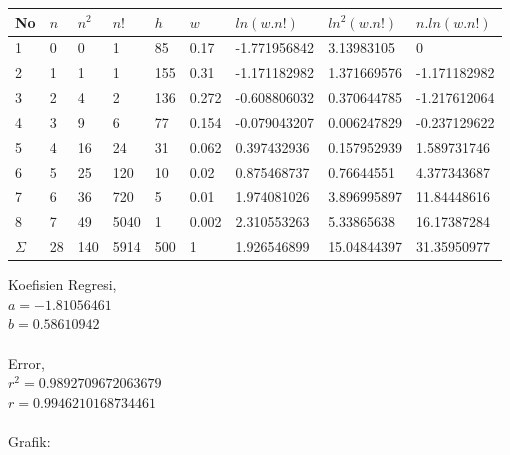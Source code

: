 \documentclass{article}
\begin{document}
			\begin{longtable}{@{}lllllllll@{}}
					\toprule
					No  & $n$  & $n^{2}$ & $n!$   & $h$   & $w$     & $ln(w.n!)$     & $ln^{2}(w.n!)$ & $n.ln(w.n!)$   \\ \midrule
				\endfirsthead
				\endhead
				\bottomrule
				\endfoot
				\endlastfoot
				1   & 0  & 0                    & 1    & 85  & 0.17  & -1.771956842 & 3.13983105                  & 0            \\
				2   & 1  & 1                    & 1    & 155 & 0.31  & -1.171182982 & 1.371669576                 & -1.171182982 \\
				3   & 2  & 4                    & 2    & 136 & 0.272 & -0.608806032 & 0.370644785                 & -1.217612064 \\
				4   & 3  & 9                    & 6    & 77  & 0.154 & -0.079043207 & 0.006247829                 & -0.237129622 \\
				5   & 4  & 16                   & 24   & 31  & 0.062 & 0.397432936  & 0.157952939                 & 1.589731746  \\
				6   & 5  & 25                   & 120  & 10  & 0.02  & 0.875468737  & 0.76644551                  & 4.377343687  \\
				7   & 6  & 36                   & 720  & 5   & 0.01  & 1.974081026  & 3.896995897                 & 11.84448616  \\
				8   & 7  & 49                   & 5040 & 1   & 0.002 & 2.310553263  & 5.33865638                  & 16.17387284  \\* \midrule
				$\Sigma$ & 28 & 140                  & 5914 & 500 & 1     & 1.926546899  & 15.04844397                 & 31.35950977  \\* \bottomrule
				\end{longtable}
			\hspace{-0.6cm}Koefisien Regresi, \\
			$a = -1.81056461$ \\
			$b = 0.58610942$ \\ \\
			Error,\\
			$r^{2} = 0.9892709672063679$ \\
			$r = 0.9946210168734461 $ \\ \\
			Grafik: 
\end{document}
